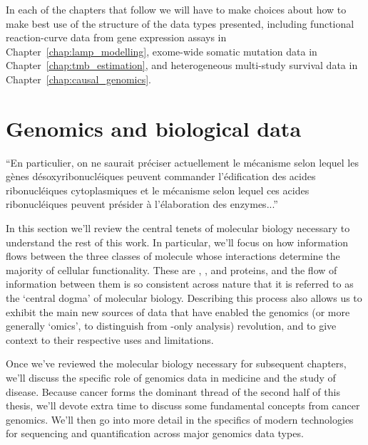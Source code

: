 \documentclass[thesis.tex]{subfiles}
\begin{document}
In each of the chapters that follow we will have to make choices about how to make best use of the structure of the data types presented, including functional reaction-curve data from gene expression assays in Chapter~\ref{chap:lamp_modelling}, exome-wide somatic mutation data in Chapter~\ref{chap:tmb_estimation}, and heterogeneous multi-study survival data in Chapter~\ref{chap:causal_genomics}. 


\section{Genomics and biological data}
\epigraph{``En particulier, on ne
saurait préciser actuellement le mécanisme selon lequel
les gènes désoxyribonucléiques peuvent commander l'édification des acides ribonucléiques cytoplasmiques et le
mécanisme selon lequel ces acides ribonucléiques
peuvent présider à l'élaboration des enzymes...''}{\citet{boivin_sur_1947}}

In this section we'll review the central tenets of molecular biology necessary to understand the rest of this work. In particular, we'll focus on how information flows between the three classes of molecule whose interactions determine the majority of cellular functionality. These are , , and proteins, and the flow of information between them is so consistent across nature that it is referred to as the `central dogma' of molecular biology. Describing this process also allows us to exhibit the main new sources of data that have enabled the genomics (or more generally `omics', to distinguish from -only analysis) revolution, and to give context to their respective uses and limitations. 

Once we've reviewed the molecular biology necessary for subsequent chapters, we'll discuss the specific role of genomics data in medicine and the study of disease. Because cancer forms the dominant thread of the second half of this thesis, we'll devote extra time to discuss some fundamental concepts from cancer genomics. We'll then go into more detail in the specifics of modern technologies for sequencing and quantification across major genomics data types.
\end{document}

